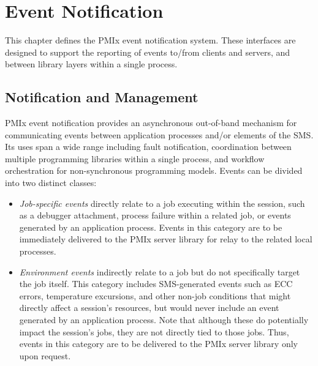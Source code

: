 \chapter{Event Notification}
\label{chap:api_event}

This chapter defines the \ac{PMIx} event notification system.
These interfaces are designed to support the reporting of events to/from clients and servers, and between library layers within a single process.

\section{Notification and Management}
\label{chap:api_event:notify}

\ac{PMIx} event notification provides an asynchronous out-of-band mechanism for communicating events between application processes and/or elements of the \ac{SMS}. Its uses span a wide range including fault notification, coordination between multiple programming libraries within a single process, and workflow orchestration for non-synchronous programming models. Events can be divided into two distinct classes:

\begin{itemize}
\item \textit{Job-specific events} directly relate to a job executing within the session, such as a debugger attachment, process failure within a related job, or events generated by an application process. Events in this category are to be immediately delivered to the \ac{PMIx} server library for relay to the related local processes.

\item \textit{Environment events} indirectly relate to a job but do not specifically target the job itself. This category includes \ac{SMS}-generated events such as \ac{ECC} errors, temperature excursions, and other non-job conditions that might directly affect a session's resources, but would never include an event generated by an application process. Note that although these do potentially impact the session's jobs, they are not directly tied to those jobs. Thus, events in this category are to be delivered to the \ac{PMIx} server library only upon request.
\end{itemize}

